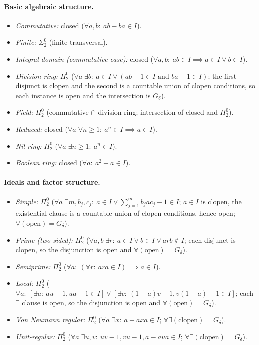 \documentclass[12pt,fleqn,a4paper]{amsart}
\renewcommand{\ge}{\geqslant}
\numberwithin{equation}{section}
\theoremstyle{definition}
\begin{document}
\paragraph{Basic algebraic structure.}
\begin{itemize}
\item \emph{Commutative:} closed ($\forall a,b:\ ab-ba\in I$).
\item \emph{Finite:} $\Sigma^0_2$ (finite transversal).
\item \emph{Integral domain (commutative case):} closed
($\forall a,b:\ ab\in I\implies a\in I\lor b\in I$).
\item \emph{Division ring:} $\Pi^0_2$
($\forall a\;\exists b:\ a\in I\lor(ab-1\in I\text{ and }ba-1\in I)$;
the first disjunct is clopen and the second is a countable union of clopen conditions,
so each instance is open and the intersection is $G_\delta$).
\item \emph{Field:} $\Pi^0_2$ (commutative $\cap$ division ring; intersection of closed and $\Pi^0_2$).
\item \emph{Reduced:} closed
($\forall a\;\forall n\ge 1:\ a^n\in I\implies a\in I$).
\item \emph{Nil ring:} $\Pi^0_2$ ($\forall a\;\exists n\ge 1:\ a^n\in I$).
\item \emph{Boolean ring:} closed ($\forall a:\ a^2-a\in I$).
\end{itemize}

\paragraph{Ideals and factor structure.}
\begin{itemize}
\item \emph{Simple:} $\Pi^0_2$
($\forall a\;\exists m,b_j,c_j:\ a\in I\lor\sum_{j=1}^mb_jac_j-1\in I$;
$a\in I$ is clopen, the existential clause is a countable union of clopen conditions,
hence open; $\forall(\text{open})=G_\delta$).
\item \emph{Prime (two-sided):} $\Pi^0_2$
($\forall a,b\;\exists r:\ a\in I\lor b\in I\lor arb\notin I$;
each disjunct is clopen, so the disjunction is open and $\forall(\text{open})=G_\delta$).
\item \emph{Semiprime:} $\Pi^0_2$
($\forall a:\ (\forall r:\ ara\in I)\implies a\in I$).
\item \emph{Local:} $\Pi^0_2$
($\forall a:\ [\exists u:\ au-1,ua-1\in I]\lor[\exists v:\ (1\!-\!a)v-1,v(1\!-\!a)-1\in I]$;
each $\exists$ clause is open, so the disjunction is open and $\forall(\text{open})=G_\delta$).
\item \emph{Von Neumann regular:} $\Pi^0_2$
($\forall a\;\exists x:\ a-axa\in I$; $\forall\exists(\text{clopen})=G_\delta$).
\item \emph{Unit-regular:} $\Pi^0_2$
($\forall a\;\exists u,v:\ uv-1,vu-1,a-aua\in I$;
$\forall\exists(\text{clopen})=G_\delta$).
\end{itemize}
\end{document}
